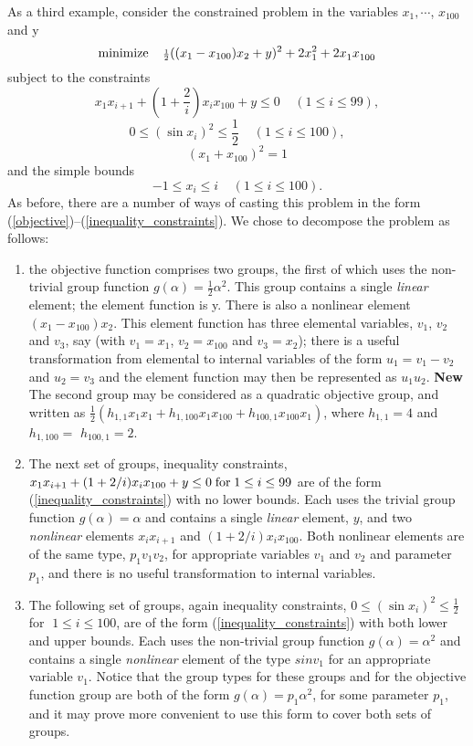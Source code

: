 \documentclass[a4paper]{article}
\newcommand{\beqn}[1]{\begin{equation}\label{#1}}
\newcommand{\eeqn}{\end{equation}}
\newcommand{\req}[1]{(\ref{#1})}
\newcommand{\ms}{\;\;\;\;}
\newcommand{\sfrac}[2]{{\scriptstyle \frac{#1}{#2}}}
\newcommand{\half}{\sfrac{1}{2}}
\begin{document}
As a third example, consider the constrained problem in the variables
$x_1 ,\cdots$, $x_{100}$ and y
\beqn{1.6.1}
{\rm minimize} \ms \half ((x_1 - x_{100}) x_2 + y)^2 +
2 x_1^2 + 2 x_1^{ } x_{100}^{ }
\eeqn
subject to the constraints
\beqn{1.6.2}
x_1 x_{i + 1} + (1 +
{\scriptstyle \frac{2}{i}}) x_i x_{100} + y \leq 0 \ms (1 \leq i \leq 99),
\eeqn
\beqn{1.6.3}
0 \leq (\sin x_i)^2 \leq \half \ms (1 \leq i \leq 100),
\eeqn
\beqn{1.6.4}
(x_1 + x_{100} )^2 = 1
\eeqn
and the simple bounds
\beqn{1.6.5}
-1 \leq x_i \leq i \ms (1 \leq i \leq 100).
\eeqn
As before, there are a number of  ways of casting  this problem in the
form   \req{objective}--\req{inequality_constraints}.   We   chose  to
decompose the problem as follows:
\begin{enumerate}
\item
the objective function comprises two groups, the first of which
uses the  non-trivial group function
$g (\alpha ) = \half \alpha^2$.  This  group contains a  single {\em
linear} element;
the element function is y. There  is also a nonlinear element
$( x_1 -  x_{100} ) x_2 $. This   element  function has  three
elemental variables, $v_1$, $v_2$ and $v_3$, say (with  $v_1  = x_1$,
$v_2  = x_{100}$ and $v_3 =  x_2$);  there  is a useful transformation
from elemental to internal variables of the form $u_1 = v_1 - v_2$ and
$u_2 = v_3$ and the  element function may then  be represented as $u_1
u_2$. {\bf New} The second group may be considered as a quadratic
objective group, and written as
$\half( h_{1,1} x_1 x_1 + h_{1,100} x_1 x_{100}
 + h_{100,1} x_{100} x_1 )$,
where $h_{1,1} = 4$ and $h_{1,100} =$
$h_{100,1} = 2$.

\item
The next set of groups,
inequality  constraints,
$ x_1 x_{i+1} + (1 + 2/i) x_i x_{100} + y  \leq 0  \; {\rm  for} \; 1
\leq i \leq 99$ are of the form \req{inequality_constraints} with no lower
 bounds.
Each uses
the trivial group
function $g   ( \alpha )  = \alpha$  and contains a
single {\em linear} element,
$y$, and  two {\em nonlinear} elements
$x_i  x_{i+1}$ and $(1 + 2/i)
x_i x_{100}$.  Both nonlinear elements are of the  same type, $p_1 v_1
v_2$, for appropriate variables  $v_1$  and $v_2$  and parameter $p_1$,
and there is no useful transformation to internal variables.

\item
The following set of  groups,
again  inequality constraints,
$0 \leq (\sin{x_i})^2 \leq \half \;$ for $\; 1 \leq  i  \leq 100$, are of
the  form \req{inequality_constraints} with  both  lower  and   upper bounds.
Each uses the
non-trivial group  function
$g (\alpha  )  = \alpha^2$ and  contains a
single  {\em   nonlinear}  element
of   the type   $sin   v_1$  for an
appropriate variable $v_1$.   Notice  that  the group  types
for these
groups and for the  objective function group
are  both of the form $g( \alpha ) = p_1 \alpha^2$, for some parameter
$p_1$, and  it  may prove
more convenient to use this form to cover both sets of groups.


\end{enumerate}
\end{document}
